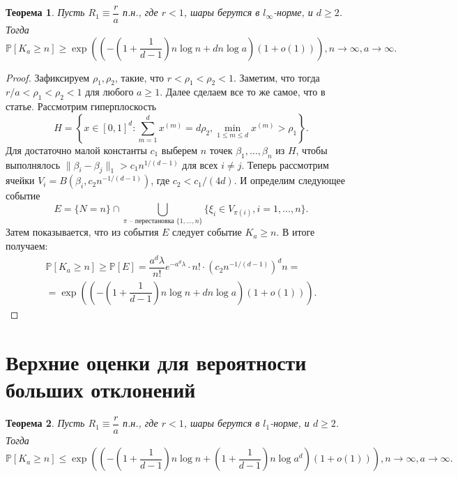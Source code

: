 \documentclass[12pt]{article}
\theoremstyle{plain}
\newtheorem{thm}{Теорема} %
\theoremstyle{definition}
\theoremstyle{remark}
\def\geq{\geqslant}
\def\leq{\leqslant}
\newcommand{\slim}{\sum\limits}
\newcommand{\PP}{\mathbb{P}}
\begin{document}
\begin{thm}
Пусть $R_1\equiv \dfrac{r}{a}$ п.н., где $r<1$, шары берутся в $l_\infty$-норме, и $d\geq 2$. Тогда $$\PP[K_a \geq n] \geq \exp \left(\left(-\left(1+\dfrac{1}{d-1}\right)n\log n + dn\log a \right)(1 + o(1))\right), n \to \infty, a\to \infty.$$
\end{thm}{}

\begin{proof} 
Зафиксируем $\rho_1, \rho_2$, такие, что $r<\rho_1<\rho_2<1$. Заметим, что тогда $r/a<\rho_1<\rho_2<1$ для любого $a\geq 1$. Далее сделаем все то же самое, что в статье. Рассмотрим гиперплоскость $$H = \left\{x\in[0, 1]^d \colon \slim_{m=1}^dx^{(m)} = d\rho_2, \min\limits_{1\leq m \leq d}x^{(m)}>\rho_1\right\}.$$ 
Для достаточно малой константы $c_1$ выберем $n$ точек $\beta_1, \ldots, \beta_n$ из $H$, чтобы выполнялось $\|\beta_i - \beta_j\|_1 > c_1n^{1/(d-1)}$ для всех $i\not= j$. Теперь рассмотрим ячейки $V_i = B(\beta_i, c_2n^{-1/(d-1)})$, где $c_2 < c_1/(4d)$. И определим следующее событие $$E = \{N = n\} \cap  \bigcup\limits_{\pi \text{ -- перестановка } \{1, \ldots, n\}} \{\xi_i \in V_{\pi(i)}, i = 1, \ldots, n\}.$$
Затем показывается, что из события $E$ следует событие $K_a \geq n$. В итоге получаем:
\begin{multline*}
    \PP[K_a \geq n] \geq \PP[E] = \dfrac{a^d\lambda}{n!}e^{-a^d\lambda}\cdot n!\cdot \left(c_2n^{-1/(d-1)}\right)^dn = \\
    =\exp \left(\left(-\left(1+\dfrac{1}{d-1}\right)n\log n + dn\log a\right)(1+o(1))\right).
\end{multline*}{}
\end{proof}{}

\section{Верхние оценки для вероятности больших отклонений}

\begin{thm}
Пусть $R_1\equiv \dfrac{r}{a}$ п.н., где $r<1$, шары берутся в $l_1$-норме, и $d\geq 2$. 
Тогда $$\PP[K_a \geq n] \leq \exp \left(\left(-\left(1+\dfrac{1}{d-1}\right)n\log n + \left(1 + \dfrac{1}{d-1}\right)n\log a^d \right)(1 + o(1))\right), n \to \infty, a\to \infty.$$
\end{thm}{}
\end{document}
